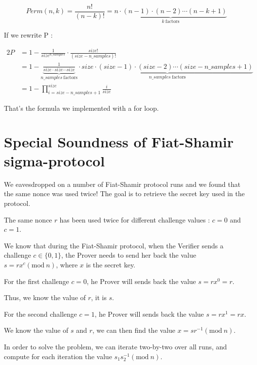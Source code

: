 \documentclass[12pt]{article}
\begin{document}
$$
    Perm(n,k) = {\frac {n!}{(n-k)!}} = \underbrace {n\cdot (n-1)\cdot (n-2)\cdots (n-k+1)} _{k\ \mathrm {factors} }
$$

If we rewrite P :

\vspace{-2em}
\begin{alignat*}{2}
    P & = 1 - {\frac{1}{size^{n\_samples}}}\cdot{\frac {size!}{(size-n\_samples)!}}\\
    & = 1 - \underbrace {\frac{1}{size \cdot size \cdots size}} _{n\_samples\ \mathrm {factors} }\cdot \underbrace {size\cdot (size-1)\cdot (size-2)\cdots (size-n\_samples+1)} _{n\_samples\ \mathrm {factors} }\\
    & = 1 -     \prod_{i=size - n\_samples + 1}^{size} \frac{i}{size}
\end{alignat*}
\vspace{-1em}

That's the formula we implemented with a for loop.

\newpage
\section{Special Soundness of Fiat-Shamir sigma-protocol}

We eavesdropped on a number of Fiat-Shamir protocol runs and we found that the same nonce was used twice! The goal is to retrieve the secret key used in the protocol.

The same nonce $r$ has been used twice for different challenge values : $c = 0$ and $c = 1$.

We know that during the Fiat-Shamir protocol, when the Verifier sends a challenge $c \in \{0, 1\}$, the Prover needs to send her back the value $s = r x^c (\textrm{mod}\ n)$, where $x$ is the secret key.

For the first challenge $c = 0$, he Prover will sends back the value $s = r x^0 = r$.

Thus, we know the value of $r$, it is $s$.

For the second challenge $c = 1$, he Prover will sends back the value $s = r x^1 = r x$.

We know the value of $s$ and $r$, we can then find the value $x = s r^{-1} (\textrm{mod}\ n)$.

\vspace{2em}

In order to solve the problem, we can iterate two-by-two over all runs, and compute for each iteration the value $s_{1} s_{2}^{-1} (\textrm{mod}\ n)$.
\end{document}
